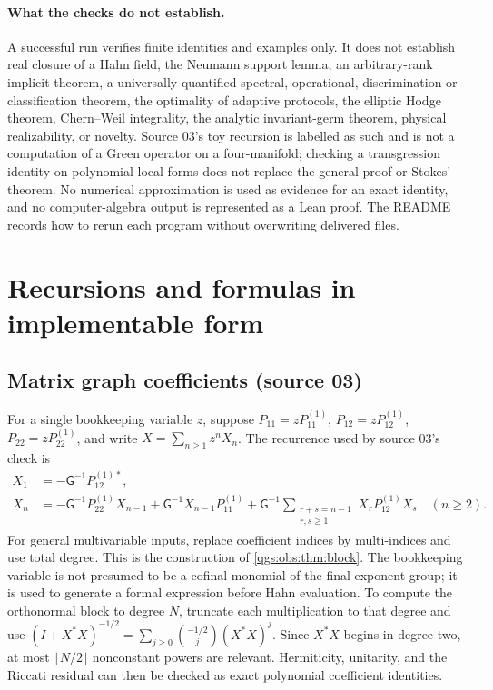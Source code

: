 \documentclass[11pt,oneside]{article}
\numberwithin{equation}{section}
\theoremstyle{plain}
\theoremstyle{definition}
\theoremstyle{remark}
\newcommand{\Gap}{\mathsf G}
\begin{document}
\paragraph{What the checks do not establish.} A successful run verifies finite identities and examples only. It does not establish real closure of a Hahn field, the Neumann support lemma, an arbitrary-rank implicit theorem, a universally quantified spectral, operational, discrimination or classification theorem, the optimality of adaptive protocols, the elliptic Hodge theorem, Chern--Weil integrality, the analytic invariant-germ theorem, physical realizability, or novelty. Source 03's toy recursion is labelled as such and is not a computation of a Green operator on a four-manifold; checking a transgression identity on polynomial local forms does not replace the general proof or Stokes' theorem. No numerical approximation is used as evidence for an exact identity, and no computer-algebra output is represented as a Lean proof. The README records how to rerun each program without overwriting delivered files.

\section{Recursions and formulas in implementable form}\label{qgs:app:recursions}

\subsection{Matrix graph coefficients (source 03)}
For a single bookkeeping variable $z$, suppose $P_{11}=zP_{11}^{(1)}$, $P_{12}=zP_{12}^{(1)}$, $P_{22}=zP_{22}^{(1)}$, and write $X=\sum_{n\ge1}z^nX_n$. The recurrence used by source 03's check is
\begin{align}
 X_1&=-\Gap^{-1}P_{12}^{(1)*},\\
 X_n&=-\Gap^{-1}P_{22}^{(1)}X_{n-1}+\Gap^{-1}X_{n-1}P_{11}^{(1)}
       +\Gap^{-1}\sum_{\substack{r+s=n-1\\r,s\ge1}}X_rP_{12}^{(1)}X_s
       \quad(n\ge2).
\end{align}
For general multivariable inputs, replace coefficient indices by multi-indices and use total degree. This is the construction of \cref{qgs:obs:thm:block}. The bookkeeping variable is not presumed to be a cofinal monomial of the final exponent group; it is used to generate a formal expression before Hahn evaluation. To compute the orthonormal block to degree $N$, truncate each multiplication to that degree and use $(I+X^*X)^{-1/2}=\sum_{j\ge0}\binom{-1/2}{j}(X^*X)^j$. Since $X^*X$ begins in degree two, at most $\lfloor N/2\rfloor$ nonconstant powers are relevant. Hermiticity, unitarity, and the Riccati residual can then be checked as exact polynomial coefficient identities.
\end{document}
